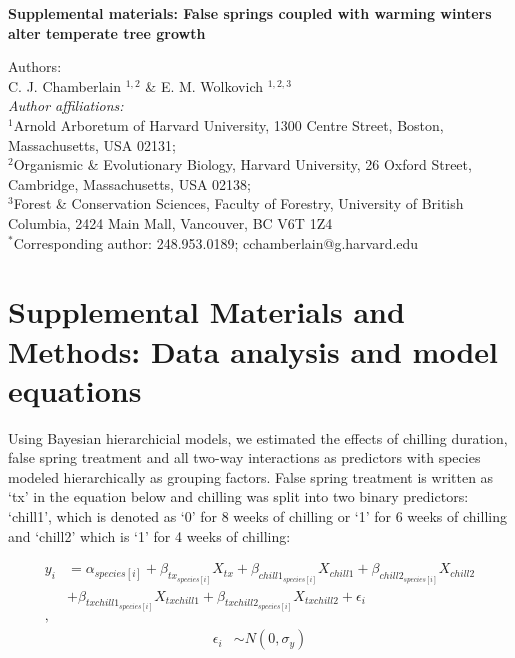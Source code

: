 \documentclass{article}\usepackage[]{graphicx}\usepackage[]{color}
\begin{document}
\noindent \textbf{\Large{Supplemental materials: False springs coupled with warming winters alter temperate tree growth}}

\noindent Authors:\\
C. J. Chamberlain $^{1,2}$ \& E. M. Wolkovich $^{1,2,3}$
\vspace{2ex}\\
\emph{Author affiliations:}\\
$^{1}$Arnold Arboretum of Harvard University, 1300 Centre Street, Boston, Massachusetts, USA 02131; \\
$^{2}$Organismic \& Evolutionary Biology, Harvard University, 26 Oxford Street, Cambridge, Massachusetts, USA 02138; \\
$^{3}$Forest \& Conservation Sciences, Faculty of Forestry, University of British Columbia, 2424 Main Mall, Vancouver, BC V6T 1Z4\\
\vspace{2ex}
$^*$Corresponding author: 248.953.0189; cchamberlain@g.harvard.edu\\

\renewcommand{\thetable}{S\arabic{table}}
\renewcommand{\thefigure}{S\arabic{figure}}
\renewcommand{\labelitemi}{$-$}



\section*{Supplemental Materials and Methods: Data analysis and model equations}
Using Bayesian hierarchicial models, we estimated the effects of chilling duration, false spring treatment and all two-way interactions as predictors with species modeled hierarchically as grouping factors. False spring treatment is written as `tx' in the equation below and chilling was split into two binary predictors: `chill1', which is denoted as `0' for 8 weeks of chilling or `1' for 6 weeks of chilling and `chill2' which is `1' for 4 weeks of chilling:

\begin{align*}
y_i &= \alpha_{species[i]} + \beta_{tx_{species[i]}}X_{tx} + \beta_{chill1_{species[i]}}X_{chill1} + \beta_{chill2_{species[i]}}X_{chill2}\\
&+ \beta_{txchill1_{species[i]}}X_{txchill1} + \beta_{txchill2_{species[i]}}X_{txchill2} + \epsilon_i \tag{1}\\,
\end{align*}
\begin{align*}
\epsilon_i & \sim N(0,\sigma_y) \\
\end{align*}
\end{document}
